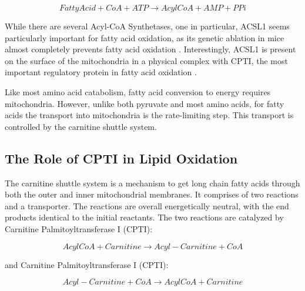 \documentclass{tufte-handout}
\begin{document}
\begin{equation}\label{eq:acs}
Fatty Acid + CoA +  ATP \rightarrow AcylCoA + AMP + PPi
\end{equation} 

While there are several Acyl-CoA Synthetases, one in particular, ACSL1 seems particularly important for fatty acid oxidation, as its genetic ablation in mice almost completely prevents fatty acid oxidation \citep{Ellis2011a}.  Interestingly, ACSL1 is present on the surface of the mitochondria in a physical complex with CPTI, the most important regulatory protein in fatty acid oxidation \citep{Lee2011l}.

  Like most amino acid catabolism, fatty acid conversion to energy requires mitochondria.  However, unlike both pyruvate and most amino acids, for fatty acids the transport into mitochondria is the rate-limiting step.  This transport is controlled by the carnitine shuttle system.

\subsection{The Role of CPTI in Lipid Oxidation}

The carnitine shuttle system is a mechanism to get long chain fatty acids through both the outer and inner mitochondrial membranes.  It comprises of two reactions and a transporter.  The reactions are overall energetically neutral, with the end products identical to the initial reactants.  The two reactions are catalyzed by Carnitine Palmitoyltransferase I (CPTI):

\begin{equation}
AcylCoA + Carnitine \rightarrow Acyl-Carnitine + CoA
\end{equation} 

and Carnitine Palmitoyltransferase I (CPTI):

\begin{equation}
Acyl-Carnitine + CoA \rightarrow AcylCoA + Carnitine
\end{equation} 
\end{document}
